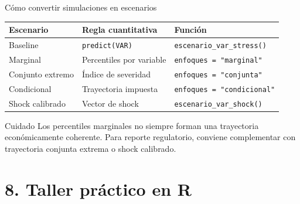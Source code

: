 \documentclass[10pt,aspectratio=169]{beamer}
\begin{document}
\begin{frame}{Cómo convertir simulaciones en escenarios}
\begin{table}
\small
\begin{tabular}{lll}
\toprule
Escenario & Regla cuantitativa & Función \\
\midrule
Baseline & \texttt{predict(VAR)} & \texttt{escenario\_var\_stress()} \\
Marginal & Percentiles por variable & \texttt{enfoques = "marginal"} \\
Conjunto extremo & Índice de severidad & \texttt{enfoques = "conjunta"} \\
Condicional & Trayectoria impuesta & \texttt{enfoques = "condicional"} \\
Shock calibrado & Vector de shock & \texttt{escenario\_var\_shock()} \\
\bottomrule
\end{tabular}
\end{table}

\begin{block}{Cuidado}
Los percentiles marginales no siempre forman una trayectoria económicamente coherente. Para reporte regulatorio, conviene complementar con trayectoria conjunta extrema o shock calibrado.
\end{block}
\end{frame}


\section{8. Taller práctico en R}
\end{document}
